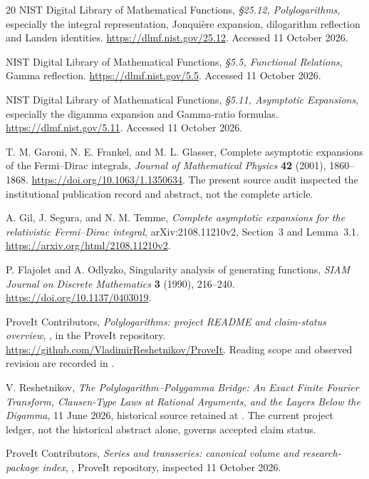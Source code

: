 \documentclass[11pt,a4paper]{article}
\theoremstyle{definition}\newtheorem{definition}[theorem]{Definition}
\theoremstyle{remark}\newtheorem{remark}[theorem]{Remark}
\numberwithin{equation}{section}
\begin{document}
\begingroup\small
\begin{thebibliography}{20}
\setlength{\itemsep}{2pt}
NIST Digital Library of Mathematical Functions,
\emph{\S25.12, Polylogarithms}, especially the integral representation,
Jonqui\`ere expansion, dilogarithm reflection and Landen identities.
\url{https://dlmf.nist.gov/25.12}. Accessed 11 October 2026.

NIST Digital Library of Mathematical Functions,
\emph{\S5.5, Functional Relations}, Gamma reflection.
\url{https://dlmf.nist.gov/5.5}. Accessed 11 October 2026.

NIST Digital Library of Mathematical Functions,
\emph{\S5.11, Asymptotic Expansions}, especially the digamma expansion
and Gamma-ratio formulas.
\url{https://dlmf.nist.gov/5.11}. Accessed 11 October 2026.

T. M. Garoni, N. E. Frankel, and M. L. Glasser,
Complete asymptotic expansions of the Fermi--Dirac integrals,
\emph{Journal of Mathematical Physics} \textbf{42} (2001), 1860--1868.
\url{https://doi.org/10.1063/1.1350634}.
The present source audit inspected the institutional publication record
and abstract, not the complete article.

A. Gil, J. Segura, and N. M. Temme,
\emph{Complete asymptotic expansions for the relativistic Fermi--Dirac
integral}, arXiv:2108.11210v2, Section~3 and Lemma~3.1.
\url{https://arxiv.org/html/2108.11210v2}.

P. Flajolet and A. Odlyzko,
Singularity analysis of generating functions,
\emph{SIAM Journal on Discrete Mathematics} \textbf{3} (1990), 216--240.
\url{https://doi.org/10.1137/0403019}.

ProveIt Contributors,
\emph{Polylogarithms: project README and claim-status overview},
, in the ProveIt repository.
\url{https://github.com/VladimirReshetnikov/ProveIt}.
Reading scope and observed revision are recorded in .

V. Reshetnikov,
\emph{The Polylogarithm--Polygamma Bridge: An Exact Finite Fourier
Transform, Clausen-Type Laws at Rational Arguments, and the Layers Below
the Digamma}, 11 June 2026, historical source retained at
.
The current project ledger, not the historical abstract alone, governs
accepted claim status.

ProveIt Contributors,
\emph{Series and transseries: canonical volume and research-package index},
,
ProveIt repository, inspected 11 October 2026.


\end{thebibliography}
\end{document}
